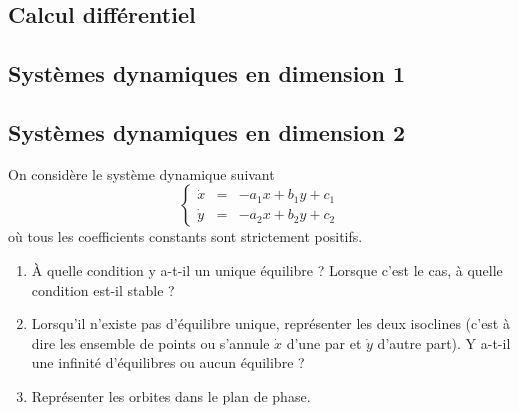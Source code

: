 \subsection{Calcul différentiel}


\subsection{Systèmes dynamiques en dimension 1}


\subsection{Systèmes dynamiques en dimension 2}

\begin{exercise} \label{SystDyn-Lineaire}
  On considère le système dynamique suivant
  $$
  \left\{\begin{array}{rcl}
         \dot x & = & -a_1 x + b_1 y + c_1 \\ 
         \dot y & = & -a_2 x + b_2 y + c_2
         \end{array}\right.
  $$
  où tous les coefficients constants sont strictement positifs.
  \begin{enumerate}
   \item À quelle condition y a-t-il un unique équilibre ? Lorsque c’est le cas, à quelle condition est-il stable ?
   \item Lorsqu’il n’existe pas d’équilibre unique, représenter les deux isoclines (c'est à dire les ensemble de points ou s'annule $\dot x$ d'une par et $\dot y$ d'autre part). Y a-t-il une infinité d’équilibres ou aucun équilibre ?
   \item Représenter les orbites dans le plan de phase.
  \end{enumerate}
\end{exercise}

